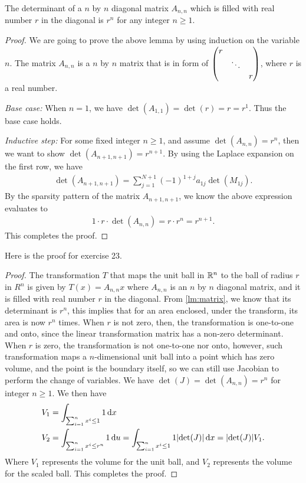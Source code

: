 \documentclass[8pt,twocolumn]{article}
\begin{document}
\begin{Answer}[number=23]
  \begin{lemma}\label{lm:matrix}
    The determinant of a $n$ by $n$ diagonal matrix $A_{n,n}$ which is filled with
    real number $r$ in the diagonal is $r^n$ for any integer $n\ge 1$.
  \end{lemma}
  \begin{proof}
    We are going to prove the above lemma by using induction on the variable
    $n$. The matrix $A_{n,n}$ is a $n$ by $n$ matrix that is in form of
    $\mqty(\dmat{r,\ddots,r})$, where $r$ is a real number.

    \emph{Base case:} When $n=1$, we have $\det(A_{1,1}) = \det(r) = r = r^1$. Thus
    the base case holds.

    \emph{Inductive step:} For some fixed integer $n\ge 1$, and assume
    $\det(A_{n,n}) = r^n$, then we want to show $\det(A_{n+1,n+1}) = r^{n+1}$.
    By using the Laplace expansion on the first row, we have
    \begin{align*}
      \det(A_{n+1,n+1}) = \sum_{j=1}^{N+1}(-1)^{1+j}a_{1j}\det(M_{1j}).
    \end{align*}
    By the sparsity pattern of the matrix $A_{n+1,n+1}$, we know the above
    expression evaluates to
    \begin{align*}
      1\cdot r\cdot \det(A_{n,n}) = r\cdot r^n = r^{n+1}.
    \end{align*}
    This completes the proof.
  \end{proof}
  Here is the proof for exercise 23.
  \begin{proof}
    The transformation $T$ that maps the unit ball in $\mathbb{R}^n$ to the ball of
    radius $r$ in $R^n$ is given by
    \(
      T(x) = A_{n,n} x
    \)
    where $A_{n,n}$ is an $n$ by $n$ diagonal matrix, and it is filled with
    real number $r$ in the diagonal. From \cref{lm:matrix}, we know that its
    determinant is $r^n$, this implies that for an area enclosed, under the
    transform, its area is now $r^n$ times. When $r$ is not zero, then, the
    transformation is one-to-one and onto, since the linear transformation
    matrix has a non-zero determinant. When $r$ is zero, the transformation is
    not one-to-one nor onto, however, such transformation maps a
    $n$-dimensional unit ball into a point which has zero volume, and the point
    is the boundary itself, so we can still use Jacobian to perform the change
    of variables. We have $\det(J) = \det(A_{n,n}) = r^n$ for integer $n\ge 1$.
    We then have
    \begin{align*}
      V_1 &= \int_{\sum_{i=1}^n x^i\le 1} 1 \dd{x} \\
      V_2 &= \int_{\sum_{i=1}^n x^i\le r^n} 1 \dd{u} = \int_{\sum_{i=1}^n x^i\le 1} 1 \abs{\det(J)} \dd{x} = \abs{\det(J)}
      V_1.
    \end{align*}
    Where $V_1$ represents the volume for the unit ball, and $V_2$ represents
    the volume for the scaled ball. This completes the proof.
  \end{proof}
\end{Answer}
\end{document}
